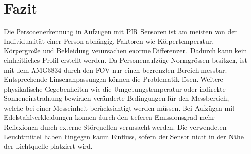 \section{Fazit}

Die Personenerkennung in Aufzügen mit \ac{PIR} Sensoren ist am meisten von der Individualität einer Person abhängig. Faktoren wie Körpertemperatur, Körpergröße und Bekleidung verursachen enorme Differenzen. Dadurch kann kein einheitliches Profil erstellt werden. Da Personenaufzüge Normgrössen besitzen, ist mit dem AMG8834 durch den \ac{FOV} nur einen begrenzten Bereich messbar. Entsprechende Linsenanpassungen können die Problematik lösen. Weitere physikalische Gegebenheiten wie die Umgebungstemperatur oder indirekte Sonneneinstrahlung bewirken veränderte Bedingungen für den Messbereich, welche bei einer Messeinheit berücksichtigt werden müssen. Bei Aufzügen mit Edelstahlverkleidungen können durch den tieferen Emissionsgrad mehr Reflexionen durch externe Störquellen verursacht werden. Die verwendeten Leuchtmittel haben hingegen kaum Einfluss, sofern der Sensor nicht in der Nähe der Lichtquelle platziert wird.     

